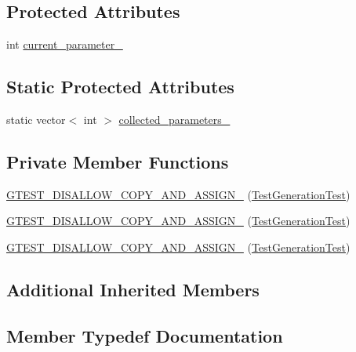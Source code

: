\subsection*{Protected Attributes}
\begin{DoxyCompactItemize}
\item 
int \mbox{\hyperlink{class_test_generation_test_a2d149b987b6dfe86ffbfae677199b0cd}{current\+\_\+parameter\+\_\+}}
\end{DoxyCompactItemize}
\subsection*{Static Protected Attributes}
\begin{DoxyCompactItemize}
\item 
static vector$<$ int $>$ \mbox{\hyperlink{class_test_generation_test_a16dfa6f4b445c7e4a7a9611b34b7a7a2}{collected\+\_\+parameters\+\_\+}}
\end{DoxyCompactItemize}
\subsection*{Private Member Functions}
\begin{DoxyCompactItemize}
\item 
\mbox{\hyperlink{class_test_generation_test_a896a79483bc30b0e0c39716ab17da8f1}{G\+T\+E\+S\+T\+\_\+\+D\+I\+S\+A\+L\+L\+O\+W\+\_\+\+C\+O\+P\+Y\+\_\+\+A\+N\+D\+\_\+\+A\+S\+S\+I\+G\+N\+\_\+}} (\mbox{\hyperlink{class_test_generation_test}{Test\+Generation\+Test}})
\item 
\mbox{\hyperlink{class_test_generation_test_a896a79483bc30b0e0c39716ab17da8f1}{G\+T\+E\+S\+T\+\_\+\+D\+I\+S\+A\+L\+L\+O\+W\+\_\+\+C\+O\+P\+Y\+\_\+\+A\+N\+D\+\_\+\+A\+S\+S\+I\+G\+N\+\_\+}} (\mbox{\hyperlink{class_test_generation_test}{Test\+Generation\+Test}})
\item 
\mbox{\hyperlink{class_test_generation_test_a896a79483bc30b0e0c39716ab17da8f1}{G\+T\+E\+S\+T\+\_\+\+D\+I\+S\+A\+L\+L\+O\+W\+\_\+\+C\+O\+P\+Y\+\_\+\+A\+N\+D\+\_\+\+A\+S\+S\+I\+G\+N\+\_\+}} (\mbox{\hyperlink{class_test_generation_test}{Test\+Generation\+Test}})
\end{DoxyCompactItemize}
\subsection*{Additional Inherited Members}


\subsection{Member Typedef Documentation}
\mbox{\label{class_test_generation_test_aeff004d79bbb376d7acecd28f9fb71c6}} 
